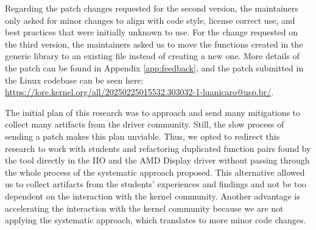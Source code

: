 Regarding the patch changes requested for the second version, the maintainers only asked 
for minor changes to align with code style, license correct use, and best practices that 
were initially unknown to use. For the change requested on the third version, the maintainers 
asked us to move the functions created in the generic library to an existing file instead of 
creating a new one. More details of the patch can be found in Appendix \ref{app:feedback}, 
and the patch submitted in the Linux codebase can be seen here:
\url{https://lore.kernel.org/all/20250225015532.303032-1-luanicaro@usp.br/}.

The initial plan of this research was to approach and send many mitigations to collect 
many artifacts from the driver community. Still, the slow process of sending a patch 
makes this plan unviable. Thus, we opted to redirect this research to work with students 
and refactoring duplicated function pairs found by the tool directly in the IIO and the 
AMD Display driver without passing through the whole process of the systematic approach 
proposed. This alternative allowed us to collect artifacts from the students' experiences 
and findings and not be too dependent on the interaction with the kernel community. 
Another advantage is accelerating the interaction with the kernel community because we are 
not applying the systematic approach, which translates to more minor code changes.
